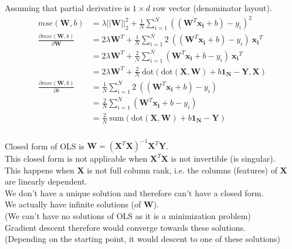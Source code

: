\documentclass[12pt, fleqn]{article}
\begin{document}
\subsubsection{}
Assuming that partial derivative is $1 \times d$ row vector (denominator layout).
\begin{equation*}
  \begin{aligned}
    mse(\mathbf{W},b)                                      & = \lambda || \mathbf{W} ||_2^2 + \frac{1}{N} \sum_{i=1}^N ((\mathbf{W}^T \mathbf{x_i} + b) - y_i)^2                               \\
    \frac{\partial mse(\mathbf{W},b)}{\partial \mathbf{W}} & = 2 \lambda \mathbf{W}^T + \frac{1}{N} \sum_{i=1}^N 2 \ ((\mathbf{W}^T \mathbf{x_i} + b) - y_i) \ \mathbf{x_i}^T                  \\
                                                           & = 2 \lambda \mathbf{W}^T + \frac{2}{N} \sum_{i=1}^N (\mathbf{W}^T \mathbf{x_i} + b - y_i) \ \mathbf{x_i}^T                        \\
                                                           & = 2 \lambda \mathbf{W}^T + \frac{2}{N} \ \text{dot}(\text{dot}(\mathbf{X}, \mathbf{W}) + b \mathbf{1_N} - \mathbf{Y}, \mathbf{X}) \\
    \frac{\partial mse(\mathbf{W},b)}{\partial b}          & = \frac{1}{N} \sum_{i=1}^N 2 \ ((\mathbf{W}^T \mathbf{x_i} + b) - y_i)                                                            \\
                                                           & = \frac{2}{N} \sum_{i=1}^N (\mathbf{W}^T \mathbf{x_i} + b - y_i)                                                                  \\
                                                           & = \frac{2}{N} \ \text{sum}(\text{dot}(\mathbf{X}, \mathbf{W})  + b \mathbf{1_N} - \mathbf{Y})
  \end{aligned}
\end{equation*}

\subsubsection{}
Closed form of OLS is $\mathbf{W} = (\mathbf{X}^T \mathbf{X})^{-1} \mathbf{X}^T \mathbf{Y}$. \\
This closed form is not applicable when $\mathbf{X}^T \mathbf{X}$ is not invertible (is singular). \\
This happens when $\mathbf{X}$ is not full column rank, i.e. the columns (features) of $\mathbf{X}$ are linearly dependent. \\
We don't have a unique solution and therefore can't have a closed form. \\
We actually have infinite solutions (of $\mathbf{W}$). \\
(We can't have no solutions of OLS as it is a minimization problem) \\
Gradient descent therefore would converge towards these solutions. \\
(Depending on the starting point, it would descent to one of these solutions)
\end{document}

